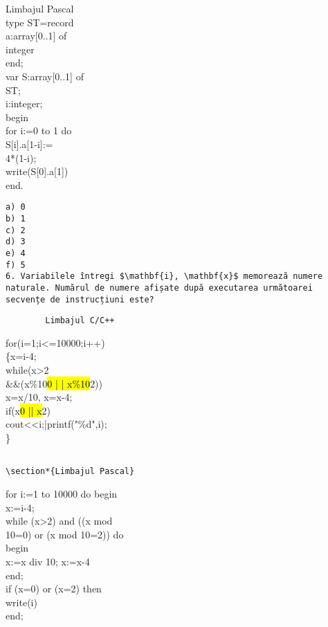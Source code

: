 \begin{verbatim}

\end{verbatim}

Limbajul Pascal\\
type ST=record\\[0pt]
a:array[0..1] of\\
integer\\
end;\\[0pt]
var S:array[0..1] of\\
ST;\\
i:integer;\\
begin\\
for i:=0 to 1 do\\[0pt]
S[i].a[1-i]:=\\
4*(1-i);\\[0pt]
write(S[0].a[1])\\
end.

\begin{verbatim}
a) 0
b) 1
c) 2
d) 3
e) 4
f) 5
6. Variabilele întregi $\mathbf{i}, \mathbf{x}$ memorează numere naturale. Numărul de numere afișate după executarea următoarei secvențe de instrucțiuni este?
\end{verbatim}

\begin{verbatim}
        Limbajul C/C++
\end{verbatim}

for(i=1;i<=10000;i++)\\
\{x=i-4;\\
while(x>2\\
\&\&(x\%10\hl{0 | | x\%10}2))\\
x=x/10, x=x-4;\\
if(x\hl{0 || x}2)\\
cout<<i;|printf("\%d",i);\\
\}

\begin{verbatim}

\section*{Limbajul Pascal}
\end{verbatim}

for i:=1 to 10000 do begin\\
x:=i-4;\\
while (x>2) and ((x mod\\
10=0) or (x mod 10=2)) do\\
begin\\
x:=x div 10; x:=x-4\\
end;\\
if (x=0) or (x=2) then\\
write(i)\\
end;

